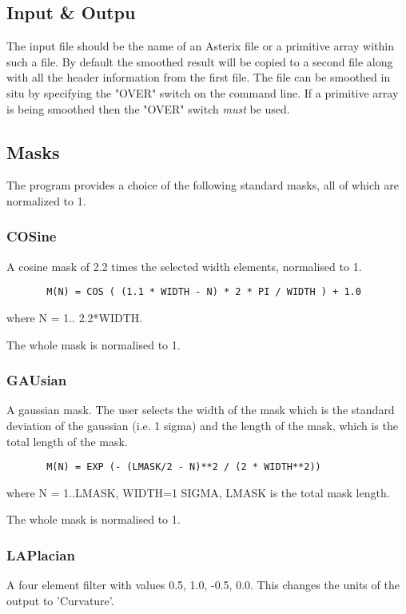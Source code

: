 \documentclass{book}
\renewcommand{\_}{{\tt\char'137}}     %
\begin{document}
\subsection{Input \& Outpu}
The input file should be the name of an Asterix file or a primitive
array within such a file. By default the smoothed
result will be copied to a second file along with all the header
information from the first file. The file can be smoothed in situ by
specifying the "OVER" switch on the command line. If a primitive array
is being smoothed then the "OVER" switch {\em must} be used.
 
\subsection{Masks}
The program provides a choice of the following standard masks,
all of which are normalized to 1.
 
\subsubsection{COSine}
A cosine mask of 2.2 times the selected width elements, normalised to 1.
\begin{verbatim}
       M(N) = COS ( (1.1 * WIDTH - N) * 2 * PI / WIDTH ) + 1.0
\end{verbatim}
where N = 1.. 2.2*WIDTH.
 
The whole mask is normalised to 1.
 
\subsubsection{GAUsian}
A gaussian mask. The user selects the width of the mask which
is the standard deviation of the gaussian (i.e. 1 sigma) and the
length of the mask, which is the total length of the mask.
 
\begin{verbatim}
       M(N) = EXP (- (LMASK/2 - N)**2 / (2 * WIDTH**2))
\end{verbatim}
where N = 1..LMASK, WIDTH=1 SIGMA, LMASK is the total mask length.
 
The whole mask is normalised to 1.
 
\subsubsection{LAPlacian}
A four element filter with values 0.5, 1.0, -0.5, 0.0. This
changes the units of the output to 'Curvature'.
 
\end{document}
